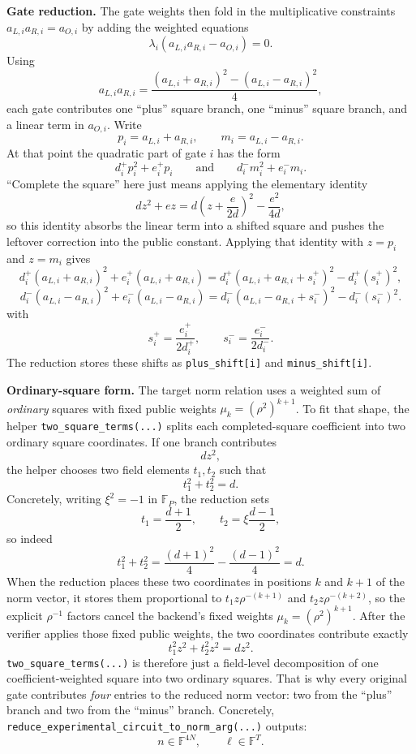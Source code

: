 \documentclass[11pt]{article}
\begin{document}
\medskip\noindent\textbf{Gate reduction.}
The gate weights then fold in the multiplicative constraints
$a_{L,i} a_{R,i} = a_{O,i}$ by adding the weighted equations
\[
\lambda_i(a_{L,i} a_{R,i} - a_{O,i}) = 0.
\]
Using
\[
a_{L,i}a_{R,i} = \frac{(a_{L,i}+a_{R,i})^2 - (a_{L,i}-a_{R,i})^2}{4},
\]
each gate contributes one ``plus'' square branch, one ``minus'' square branch, and a linear term in
$a_{O,i}$. Write
\[
p_i = a_{L,i}+a_{R,i}, \qquad m_i = a_{L,i}-a_{R,i}.
\]
At that point the quadratic part of gate $i$ has the form
\[
d_i^+ p_i^2 + e_i^+ p_i
\qquad\text{and}\qquad
d_i^- m_i^2 + e_i^- m_i.
\]
``Complete the square'' here just means applying the elementary identity
\[
d z^2 + e z = d\left(z + \frac{e}{2d}\right)^2 - \frac{e^2}{4d},
\]
so this identity absorbs the linear term into a shifted square and pushes the leftover correction into the
public constant. Applying that identity with $z=p_i$ and $z=m_i$ gives
\[
d_i^+ (a_{L,i}+a_{R,i})^2 + e_i^+ (a_{L,i}+a_{R,i})
= d_i^+ (a_{L,i}+a_{R,i}+s_i^+)^2 - d_i^+ (s_i^+)^2,
\]
\[
d_i^- (a_{L,i}-a_{R,i})^2 + e_i^- (a_{L,i}-a_{R,i})
= d_i^- (a_{L,i}-a_{R,i}+s_i^-)^2 - d_i^- (s_i^-)^2.
\]
with
\[
s_i^+ = \frac{e_i^+}{2 d_i^+}, \qquad s_i^- = \frac{e_i^-}{2 d_i^-}.
\]
The reduction stores these shifts as \texttt{plus\_shift[i]} and \texttt{minus\_shift[i]}.

\medskip\noindent\textbf{Ordinary-square form.}
The target norm relation uses a weighted sum of \emph{ordinary} squares with fixed public weights
$\mu_k = (\rho^2)^{k+1}$. To fit that shape, the helper \texttt{two\_square\_terms(...)} splits
each completed-square coefficient into two ordinary square coordinates. If one branch contributes
\[
d z^2,
\]
the helper chooses two field elements $t_1,t_2$ such that
\[
t_1^2 + t_2^2 = d.
\]
Concretely, writing $\xi^2 = -1$ in $\mathbb{F}_P$, the reduction sets
\[
t_1 = \frac{d+1}{2}, \qquad t_2 = \xi \frac{d-1}{2},
\]
so indeed
\[
t_1^2 + t_2^2
= \frac{(d+1)^2}{4} - \frac{(d-1)^2}{4}
= d.
\]
When the reduction places these two coordinates in positions $k$ and $k+1$ of the norm vector, it stores
them proportional to $t_1 z \rho^{-(k+1)}$ and $t_2 z \rho^{-(k+2)}$, so the explicit $\rho^{-1}$ factors cancel the
backend's fixed weights $\mu_k = (\rho^2)^{k+1}$. After the verifier applies those fixed public
weights, the two coordinates contribute
exactly
\[
t_1^2 z^2 + t_2^2 z^2 = d z^2.
\]
\texttt{two\_square\_terms(...)} is therefore just a field-level decomposition of one coefficient-weighted
square into two ordinary squares. That is why every original
gate contributes \emph{four} entries to the reduced norm vector: two from the ``plus'' branch and
two from the ``minus'' branch. Concretely,
\texttt{reduce\_experimental\_circuit\_to\_norm\_arg(...)} outputs:
\[
n \in \mathbb{F}^{4N}, \qquad \ell \in \mathbb{F}^{T}.
\]
\end{document}
